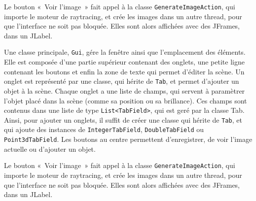 \documentclass[a4paper]{article}
\begin{document}
    Le bouton «~Voir l'image~» fait appel à la classe \verb+GenerateImageAction+, qui importe le moteur de raytracing, et crée les images dans un autre thread, pour que l'interface ne soit pas bloquée.
    Elles sont alors affichées avec des JFrames, dans un JLabel.
    
    Une classe principale, \verb+Gui+, gére la fenêtre ainsi que l'emplacement des éléments.
    Elle est composée d'une partie supérieur contenant des onglets, une petite ligne contenant les boutons et enfin la zone de texte qui permet d'éditer la scène.
    Un onglet est représenté par une classe, qui hérite de \verb+Tab+, et permet d'ajouter un objet à la scène.
    Chaque onglet a une liste de champs, qui servent à paramètrer l'objet placé dans la scène (comme sa position ou sa brillance).
    Ces champs sont contenus dans une liste de type \verb+List<TabField>+,  qui est geré par la classe Tab.
    Ainsi, pour ajouter un onglets, il suffit de créer une classe qui hérite de \verb+Tab+, et qui ajoute des instances de \verb+IntegerTabField+, \verb+DoubleTabField+ ou \verb+Point3dTabField+.
    Les boutons au centre permettent d'enregistrer, de voir l'image actuelle ou d'ajouter un objet.
    
    Le bouton «~Voir l'image~» fait appel à la classe \verb+GenerateImageAction+, qui importe le moteur de raytracing, et crée les images dans un autre thread, pour que l'interface ne soit pas bloquée.
    Elles sont alors affichées avec des JFrames, dans un JLabel.
    
\end{document}
